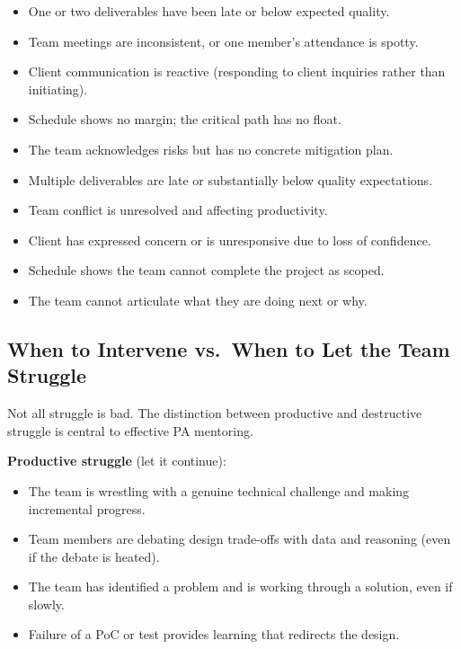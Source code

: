 \begin{faqbox}
\begin{itemize}[nosep,leftmargin=1.5em]
\item One or two deliverables have been late or below expected quality.
\item Team meetings are inconsistent, or one member's attendance is spotty.
\item Client communication is reactive (responding to client inquiries rather than initiating).
\item Schedule shows no margin; the critical path has no float.
\item The team acknowledges risks but has no concrete mitigation plan.
\end{itemize}
\end{faqbox}

\begin{faqbox}
\begin{itemize}[nosep,leftmargin=1.5em]
\item Multiple deliverables are late or substantially below quality expectations.
\item Team conflict is unresolved and affecting productivity.
\item Client has expressed concern or is unresponsive due to loss of confidence.
\item Schedule shows the team cannot complete the project as scoped.
\item The team cannot articulate what they are doing next or why.
\end{itemize}
\end{faqbox}

\subsection{When to Intervene vs.\ When to Let the Team Struggle}

Not all struggle is bad. The distinction between productive and destructive struggle is central to effective PA mentoring.

\textbf{Productive struggle} (let it continue):
\begin{itemize}[nosep,leftmargin=1.5em]
\item The team is wrestling with a genuine technical challenge and making incremental progress.
\item Team members are debating design trade-offs with data and reasoning (even if the debate is heated).
\item The team has identified a problem and is working through a solution, even if slowly.
\item Failure of a PoC or test provides learning that redirects the design.
\end{itemize}

